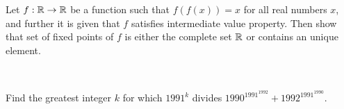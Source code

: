 \begin{problem}
\label{week2:p9}
    Let $f : \mathbb{R} \to \mathbb{R}$ be a function such that $f(f(x)) = x$ for all real numbers $x$, and further it is given that $f$ satisfies intermediate value property. Then show that set of fixed points of $f$ is either the complete set $\mathbb{R}$ or contains an unique element. 
\end{problem}

\ 

\begin{problem}
\label{week2:p10}
    Find the greatest integer $k$ for which $1991^k$ divides $\displaystyle{1990^{1991^{1992}}} + 1992^{1991^{1990}}$.
\end{problem}

